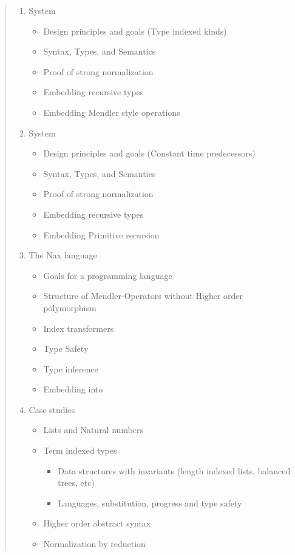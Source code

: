 \begin{quote}
\begin{enumerate}[1.]
\item System \Fi
  \begin{itemize}
     \item Design principles and goals (Type indexed kinds)
     \item Syntax, Types, and Semantics
     \item Proof of strong normalization
     \item Embedding recursive types
     \item Embedding Mendler style operations
  \end{itemize}
  
\item System \Fixi
  \begin{itemize}
     \item Design principles and goals (Constant time predecessors)
     \item Syntax, Types, and Semantics
     \item Proof of strong normalization
     \item Embedding recursive types
     \item Embedding Primitive recursion
  \end{itemize}
  
\item The Nax language
  \begin{itemize}
    \item Goals for a programming language
    \item Structure of Mendler-Operators without Higher order polymorphism
    \item Index transformers
    \item Type Safety
    \item Type inference
    \item Embedding into \Fixw
  \end{itemize}
  
\item Case studies
  \begin{itemize}
    \item Lists and Natural numbers
    \item Term indexed types
    	\begin{itemize}
    	  \item Data structures with invariants (length indexed lists, balanced trees, etc)
    	  \item Languages, substitution, progress and type safety
    	\end{itemize}
    \item Higher order abstract syntax
    \item Normalization by reduction
  \end{itemize}


\end{enumerate}
\end{quote}
